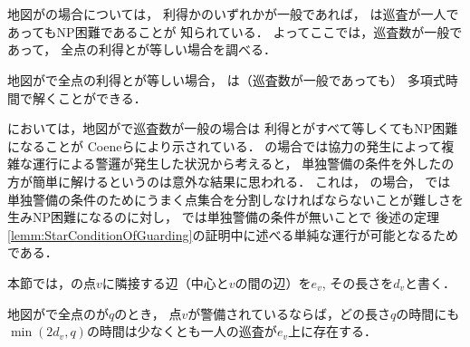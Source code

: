 \chapter{{\graphStar}}
\label{chapter: star}

地図が{\graphStar}の場合については，
利得か{\maxIdletime}のいずれかが一般であれば，
{\patProb}は巡査が一人であってもNP困難であることが
知られている\cite[Theorem~5 and 6]{coene2011charlemagne}．
よってここでは，巡査数が一般であって，
全点の利得と{\maxIdletime}が等しい場合を調べる．

\begin{theo}
  \label{theo:StarUnaryProfitAndIdletime}
  地図が{\graphStar}で全点の利得と{\maxIdletime}が等しい場合，
  {\patProb}は（巡査数が一般であっても）
  多項式時間で解くことができる．
\end{theo}

{\independentPatProb}においては，地図が{\graphStar}で巡査数が一般の場合は
利得と{\maxIdletime}がすべて等しくてもNP困難になることが
Coeneらにより示されている\cite[Theorem~10]{coene2011charlemagne}．
{\graphLine}の場合では協力の発生によって複雑な運行による警邏が発生した状況から考えると，
単独警備の条件を外した{\patProb}の方が簡単に解けるというのは意外な結果に思われる．
これは，
{\graphStar}の場合，
{\independentPatProb}では
単独警備の条件のためにうまく点集合を分割しなければならないことが難しさを生みNP困難になるのに対し，
{\patProb}では単独警備の条件が無いことで
後述の定理\ref{lemm:StarConditionOfGuarding}の証明中に述べる単純な運行が可能となるためである．

本節では，{\graphStar}の点$v$に隣接する辺（中心と$v$の間の辺）を$e_v$, その長さを$d_v$と書く．

\begin{lemm}
  \label{lemm:StarCostOfVertex}
  地図が{\graphStar}で全点の{\maxIdletime}が$q$のとき，
  点$v$が警備されているならば，どの長さ$q$の時間にも
  $\min(2d_v, q)$の時間は少なくとも一人の巡査が$e_v$上に存在する．
\end{lemm}

